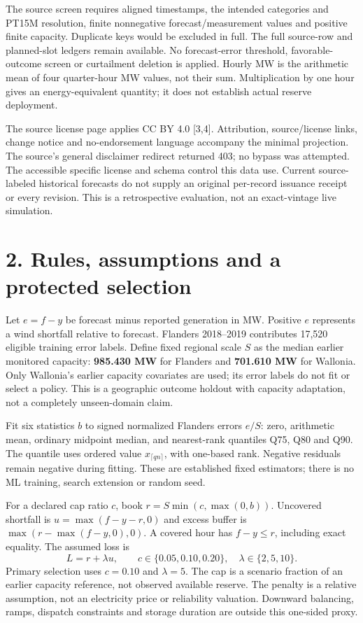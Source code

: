 \documentclass[10pt,letterpaper]{article}
\begin{document}
The source screen requires aligned timestamps, the intended categories and PT15M resolution, finite nonnegative forecast/measurement values and positive finite capacity. Duplicate keys would be excluded in full. The full source-row and planned-slot ledgers remain available. No forecast-error threshold, favorable-outcome screen or curtailment deletion is applied. Hourly MW is the arithmetic mean of four quarter-hour MW values, not their sum. Multiplication by one hour gives an energy-equivalent quantity; it does not establish actual reserve deployment.

The source license page applies CC BY 4.0 [3,4]. Attribution, source/license links, change notice and no-endorsement language accompany the minimal projection. The source's general disclaimer redirect returned 403; no bypass was attempted. The accessible specific license and schema control this data use. Current source-labeled historical forecasts do not supply an original per-record issuance receipt or every revision. This is a retrospective evaluation, not an exact-vintage live simulation.
\newpage
\section*{2. Rules, assumptions and a protected selection}
Let $e=f-y$ be forecast minus reported generation in MW. Positive $e$ represents a wind shortfall relative to forecast. Flanders 2018--2019 contributes 17,520 eligible training error labels. Define fixed regional scale $S$ as the median earlier monitored capacity: \textbf{985.430 MW} for Flanders and \textbf{701.610 MW} for Wallonia. Only Wallonia's earlier capacity covariates are used; its error labels do not fit or select a policy. This is a geographic outcome holdout with capacity adaptation, not a completely unseen-domain claim.

Fit six statistics $b$ to signed normalized Flanders errors $e/S$: zero, arithmetic mean, ordinary midpoint median, and nearest-rank quantiles Q75, Q80 and Q90. The quantile uses ordered value $x_{\lceil qn\rceil}$, with one-based rank. Negative residuals remain negative during fitting. These are established fixed estimators; there is no ML training, search extension or random seed.

For a declared cap ratio $c$, book $r=S\min(c,\max(0,b))$. Uncovered shortfall is $u=\max(f-y-r,0)$ and excess buffer is $\max(r-\max(f-y,0),0)$. A covered hour has $f-y\leq r$, including exact equality. The assumed loss is
\[ L=r+\lambda u,\qquad c\in\{0.05,0.10,0.20\},\quad\lambda\in\{2,5,10\}. \]
Primary selection uses $c=0.10$ and $\lambda=5$. The cap is a scenario fraction of an earlier capacity reference, not observed available reserve. The penalty is a relative assumption, not an electricity price or reliability valuation. Downward balancing, ramps, dispatch constraints and storage duration are outside this one-sided proxy.
\end{document}

